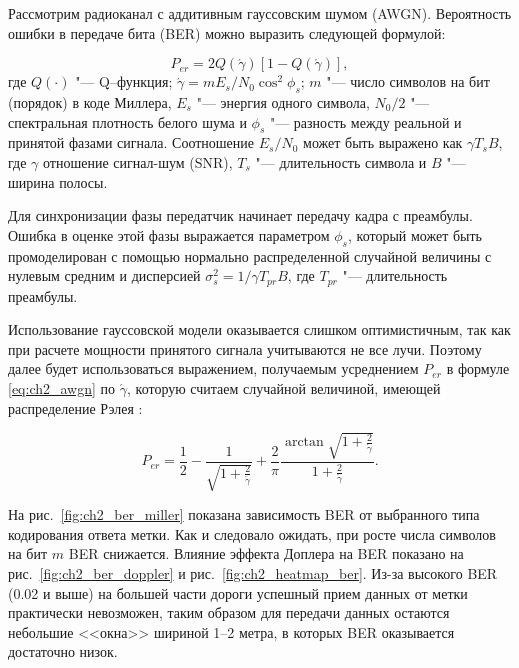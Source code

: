 Рассмотрим радиоканал с аддитивным гауссовским шумом (AWGN). Вероятность ошибки в передаче бита (BER) можно выразить следующей формулой:

\begin{equation}
	P_{er} = 2Q(\acute{\gamma})[1-Q(\acute{\gamma})],
	\label{eq:ch2_awgn}
\end{equation}
где $Q(\cdot)$ "--- Q--функция; $\acute{\gamma} = mE_s/N_0\cos^2{\phi_s}$; $m$ "--- число символов на бит (порядок) в коде Миллера, $E_s$ "--- энергия одного символа, $N_0/2$ "--- спектральная плотность белого шума и $\phi_s$ "--- разность между реальной и принятой фазами сигнала. Соотношение $E_s/N_0$ может быть выражено как $\gamma T_s B$, где $\gamma$ отношение сигнал-шум (SNR), $T_s$ "--- длительность символа и $B$ "--- ширина полосы.

Для синхронизации фазы передатчик начинает передачу кадра с преамбулы. Ошибка в оценке этой фазы выражается параметром $\phi_s$, который может быть промоделирован с помощью нормально распределенной случайной величины с нулевым средним и дисперсией $\sigma_s^2 = 1/\gamma T_{pr}B$, где $T_{pr}$ "--- длительность преамбулы.

Использование гауссовской модели оказывается слишком оптимистичным, так как при расчете мощности принятого сигнала учитываются не все лучи. Поэтому далее будет использоваться выражением, получаемым усреднением $P_{er}$ в формуле \eqref{eq:ch2_awgn} по $\acute{\gamma}$, которую считаем случайной величиной, имеющей распределение Рэлея \cite{Lazaro2009}:

$$
	P_{er} = \frac{1}{2} - \frac{1}{\sqrt{1+\frac{2}{\acute{\gamma}}}} +
			 \frac{2}{\pi}\frac{\arctan{\sqrt{1+\frac{2}{\acute{\gamma}}}}}{1+\frac{2}{\acute{\gamma}}}.
$$

На рис.~\ref{fig:ch2_ber_miller} показана зависимость BER от выбранного типа кодирования ответа метки. Как и следовало ожидать, при росте числа символов на бит $m$ BER снижается. Влияние эффекта Доплера на BER показано на рис.~\ref{fig:ch2_ber_doppler} и рис.~\ref{fig:ch2_heatmap_ber}. Из-за высокого BER (0.02 и выше) на большей части дороги успешный прием данных от метки практически невозможен, таким образом для передачи данных остаются небольшие <<окна>> шириной 1--2 метра, в которых BER оказывается достаточно низок.








